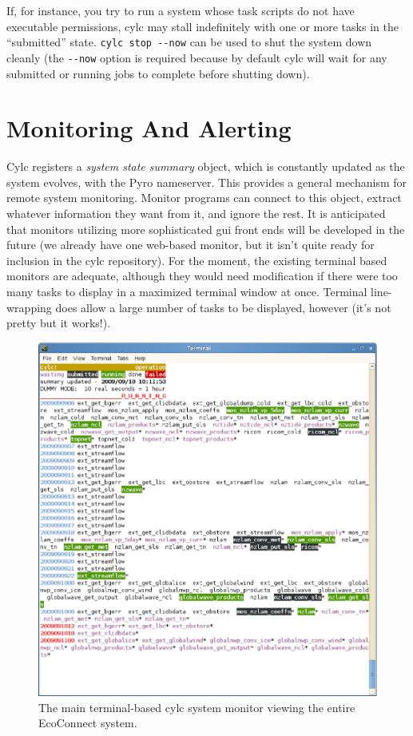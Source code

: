\documentclass[11pt,a4paper]{article}
\begin{document}
If, for instance, you try to run a system whose task scripts do not have 
executable permissions, cylc may stall indefinitely with one or more
tasks in the ``submitted'' state. \lstinline=cylc stop --now= can be
used to shut the system down cleanly (the \lstinline=--now= option is
required because by default cylc will wait for any submitted or running
jobs to complete before shutting down).


\pagebreak
\section{Monitoring And Alerting}
\label{SystemMonitors}

Cylc registers a {\em system state summary} object, which is constantly
updated as the system evolves, with the Pyro nameserver. This provides a
general mechanism for remote system monitoring. Monitor programs can
connect to this object, extract whatever information they want from it,
and ignore the rest. It is anticipated that monitors utilizing more
sophisticated gui front ends will be developed in the future (we already
have one web-based monitor, but it isn't quite ready for inclusion in
the cylc repository). For the moment, the existing terminal based
monitors are adequate, although they would need modification if there
were too many tasks to display in a maximized terminal window at once.
Terminal line-wrapping does allow a large number of tasks to be
displayed, however (it's not pretty but it works!). 

\begin{figure}
    \begin{center}
        \includegraphics[width=14cm]{eco-monitor} 
    \end{center}
    \caption[monitor view of EcoConnect]{\small The main terminal-based
    cylc system monitor viewing the entire EcoConnect system.}
    \label{fig-monitor-eco} 
\end{figure} 
\end{document}
